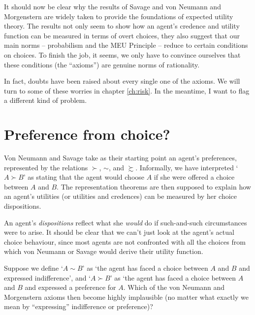 
It should now be clear why the results of Savage and von Neumann and
Morgenstern are widely taken to provide the foundations of expected
utility theory. The results not only seem to show how an agent's
credence and utility function can be measured in terms of overt
choices, they also suggest that our main norms -- probabilism and the
MEU Principle -- reduce to certain conditions on choices. To finish
the job, it seems, we only have to convince ourselves that these
conditions (the ``axioms'') are genuine norms of rationality.

In fact, doubts have been raised about every single one of the axioms.
We will turn to some of these worries in chapter \ref{ch:risk}. In the
meantime, I want to flag a different kind of problem.

\section{Preference from choice?}\label{sec:preferences-choices}

Von Neumann and Savage take as their starting point an agent's
preferences, represented by the relations $\succ$, $\sim$, and
$\succsim$. Informally, we have interpreted `$A \succ B$' as stating
that the agent would choose $A$ if she were offered a choice between
$A$ and $B$. The representation theorems are then supposed to explain
how an agent's utilities (or utilities and credences) can be measured
by her choice dispositions.

An agent's \emph{dispositions} reflect what she \emph{would} do if
such-and-such circumstances were to arise. It should be clear that we
can't just look at the agent's actual choice behaviour, since most
agents are not confronted with all the choices from which von Neumann
or Savage would derive their utility function.

\begin{exercise}{2}
  Suppose we define `$A \sim B$' as `the agent has faced a choice between $A$
  and $B$ and expressed indifference', and `$A \succ B$' as `the agent has faced
  a choice between $A$ and $B$ and expressed a preference for $A$. Which of the
  von Neumann and Morgenstern axioms then become highly implausible (no matter
  what exactly we mean by ``expressing'' indifference or preference)?
\end{exercise}

